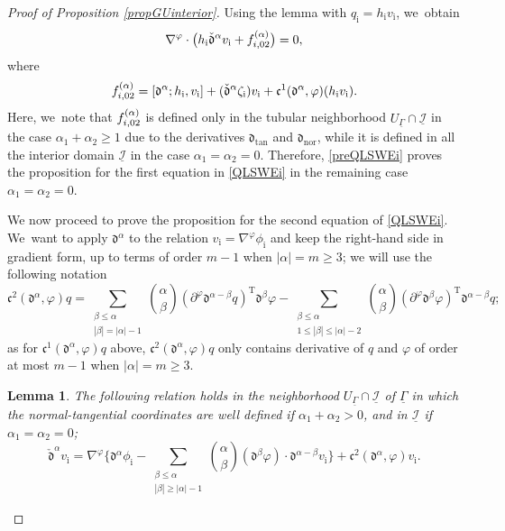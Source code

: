 \documentclass[11pt]{article}
\newcommand{\dtan}{{\mathfrak d}_\mathrm{tan}}
\newcommand{\dnor}{{\mathfrak d}_\mathrm{nor}}
\newcommand{\cI}{{\mathcal I}}
\newcommand{\ul}[1]{\underline{#1}}
\newcommand{\itGamma}{\mathit{\Gamma}}
\newcommand{\cmfalpha}{\check{\mathfrak{d}}^{\alpha}}
\newtheorem{lemma}[theorem]{Lemma}
\theoremstyle{definition}
\begin{document}
\begin{proof}[Proof of Proposition \ref{propGUinterior}]
Using the lemma with $q_\mathrm{i}=h_\mathrm{i}v_\mathrm{i}$, we~obtain
\begin{equation}\label{preQLSWEi}
\nabla^\varphi\cdot\bigl(h_\mathrm{i} \cmfalpha v_\mathrm{i} + f_{{\rm i},02}^{(\alpha)} \bigr)=0,
\end{equation}
where
\begin{equation}\label{deffi02}
f_{{\rm i},02}^{(\alpha)}
= [\mathfrak{d}^{\alpha}; h_\mathrm{i},v_\mathrm{i}] + (\cmfalpha \zeta_\mathrm{i})v_\mathrm{i} + \mathfrak{c}^1({\mathfrak d}^\alpha,\varphi)(h_\mathrm{i} v_\mathrm{i}).
\end{equation}
Here, we~note that $f_{{\rm i},02}^{(\alpha)}$ is defined only in the tubular neighborhood $U_{\ul{\itGamma}}\cap\ul{\cI}$ in the case $\alpha_1+\alpha_2\geq1$
due to the derivatives $\dtan$ and $\dnor$, while it is defined in all the interior domain $\ul{\cI}$ in the case $\alpha_1=\alpha_2=0$.
Therefore, \eqref{preQLSWEi} proves the proposition for the first equation in \eqref{QLSWEi} in the remaining case $\alpha_1=\alpha_2=0$.

We now proceed to prove the proposition for the second equation of \eqref{QLSWEi}. We~want to apply ${\mathfrak d}^\alpha$ to the relation $v_\mathrm{i}=\nabla^\varphi \phi_\mathrm{i}$ and keep the right-hand side in gradient form,
up to terms of order $m-1$ when $|\alpha|=m\geq 3$; we will use the following notation
\[
\mathfrak{c}^2({\mathfrak d}^\alpha,\varphi)q=
\sum_{\substack{\beta\leq\alpha\\ |\beta|=|\alpha|-1}} \binom{\alpha}{\beta} (\partial^\varphi\mathfrak{d}^{\alpha-\beta}q)^\mathrm{T}\mathfrak{d}^{\beta}\varphi
- \sum_{\substack{\beta\leq\alpha\\ 1\leq|\beta|\leq|\alpha|-2}} \binom{\alpha}{\beta}
(\partial^\varphi\mathfrak{d}^{\beta}\varphi)^\mathrm{T}\mathfrak{d}^{\alpha-\beta}q;
\]
as for $\mathfrak{c}^1({\mathfrak d}^\alpha,\varphi)q$ above,
$\mathfrak{c}^2({\mathfrak d}^\alpha,\varphi)q$ only contains derivative of $q$ and $\varphi$ of order at most $m-1$ when $\vert \alpha\vert=m\geq 3$.

\begin{lemma}
The following relation holds in the neighborhood $U_{\ul{\itGamma}}\cap \ul{\cI}$ of $\underline{\itGamma}$
in which the normal-tangential coordinates are well defined if $\alpha_1+\alpha_2>0$, and in $\ul{\cI}$ if $\alpha_1=\alpha_2=0$;
\begin{equation}\label{preQLSWEi2}
\cmfalpha v_\mathrm{i}= \nabla^\varphi\biggl\{ \mathfrak{d}^{\alpha}\phi_\mathrm{i}
- \sum_{\substack{\beta\leq\alpha\\ |\beta|\geq|\alpha|-1}} \binom{\alpha}{\beta} (\mathfrak{d}^{\beta}\varphi)\cdot\mathfrak{d}^{\alpha-\beta}v_\mathrm{i} \biggr\}
+\mathfrak{c}^2({\mathfrak d}^\alpha,\varphi)v_\mathrm{i}.
\end{equation}
\end{lemma}


\end{proof}
\end{document}
